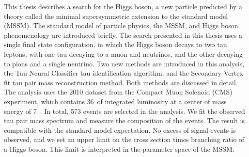 This thesis describes a search for the Higgs boson, a new particle predicted by a theory called the minimal supersymmetric extension to the standard model (MSSM).  The standard model of particle physics, the MSSM, and Higgs boson phenomenology are introduced briefly. The search presented in this thesis uses a single final state configuration, in which the Higgs boson decays to two tau leptons, with one tau decaying to a muon and neutrinos, and the other decaying to pions and a single neutrino.  Two new methods are introduced in this analysis, the Tau Neural Classifier tau identification algorithm, and the Secondary Vertex fit tau pair mass reconstruction method.  Both methods are discussed in detail.  The analysis uses the 2010 dataset from the Compact Muon Solenoid (CMS) experiment, which contains 36~\pbinv of integrated luminosity at a center of mass energy of 7~\TeV.  In total, 573 events are selected in the analysis.  We fit the observed tau pair mass spectrum and measure the composition of the events. The result is compatible with the standard model expectation.  No excess of signal events is observed, and we set an upper limit on the cross section times branching ratio of a Higgs boson.  This limit is interpreted in the parameter space of the MSSM.
